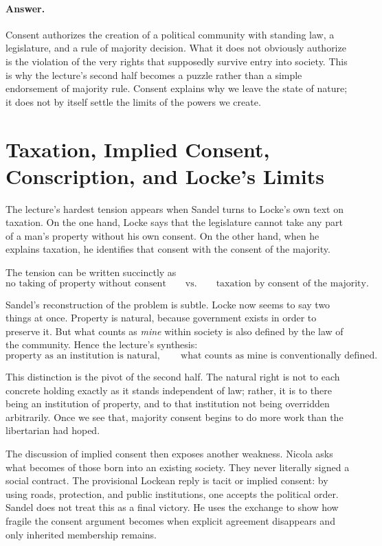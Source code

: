 \paragraph{Answer.} Consent authorizes the creation of a political community with standing law, a legislature, and a rule of majority decision. What it does not obviously authorize is the violation of the very rights that supposedly survive entry into society. This is why the lecture's second half becomes a puzzle rather than a simple endorsement of majority rule. Consent explains why we leave the state of nature; it does not by itself settle the limits of the powers we create.

\section{Taxation, Implied Consent, Conscription, and Locke's Limits}

The lecture's hardest tension appears when Sandel turns to Locke's own text on taxation. On the one hand, Locke says that the legislature cannot take any part of a man's property without his own consent. On the other hand, when he explains taxation, he identifies that consent with the consent of the majority.

The tension can be written succinctly as
\begin{equation}
\text{no taking of property without consent}
\qquad\text{vs.}\qquad
\text{taxation by consent of the majority}.
\end{equation}

Sandel's reconstruction of the problem is subtle. Locke now seems to say two things at once. Property is natural, because government exists in order to preserve it. But what counts as \emph{mine} within society is also defined by the law of the community. Hence the lecture's synthesis:
\begin{equation}
\text{property as an institution is natural},
\qquad
\text{what counts as mine is conventionally defined}.
\end{equation}

This distinction is the pivot of the second half. The natural right is not to each concrete holding exactly as it stands independent of law; rather, it is to there being an institution of property, and to that institution not being overridden arbitrarily. Once we see that, majority consent begins to do more work than the libertarian had hoped.

The discussion of implied consent then exposes another weakness. Nicola asks what becomes of those born into an existing society. They never literally signed a social contract. The provisional Lockean reply is tacit or implied consent: by using roads, protection, and public institutions, one accepts the political order. Sandel does not treat this as a final victory. He uses the exchange to show how fragile the consent argument becomes when explicit agreement disappears and only inherited membership remains.


